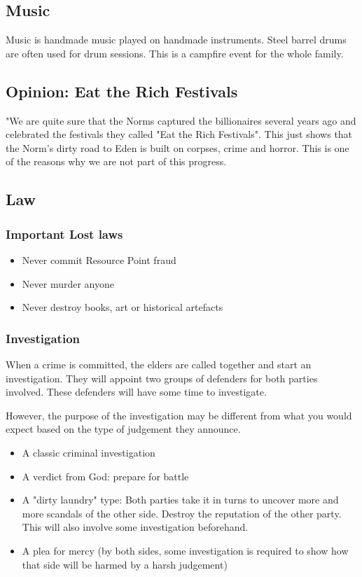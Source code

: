 \subsection{Music}

Music is handmade music played on handmade instruments. Steel barrel drums are often used for drum sessions. This is a campfire event for the whole family.

\subsection{Opinion: Eat the Rich Festivals}

"We are quite sure that the Norms captured the billionaires several years ago and celebrated the festivals they called "Eat the Rich Festivals". This just shows that the Norm's dirty road to Eden is built on corpses, crime and horror. This is one of the reasons why we are not part of this progress.

\subsection{Law}
\label{sec:Lost law}

\subsubsection{Important Lost laws}

\begin{itemize}
\item{Never commit Resource Point fraud}
\item{Never murder anyone}
\item{Never destroy books, art or historical artefacts}
\end{itemize}

\subsubsection{Investigation}

When a crime is committed, the elders are called together and start an investigation. They will appoint two groups of defenders for both parties involved. These defenders will have some time to investigate.

However, the purpose of the investigation may be different from what you would expect based on the type of judgement they announce.

\begin{itemize}
    \item A classic criminal investigation
    \item A verdict from God: prepare for battle
    \item A "dirty laundry" type: Both parties take it in turns to uncover more and more scandals of the other side. Destroy the reputation of the other party. This will also involve some investigation beforehand.
    \item A plea for mercy (by both sides, some investigation is required to show how that side will be harmed by a harsh judgement)
\end{itemize}


